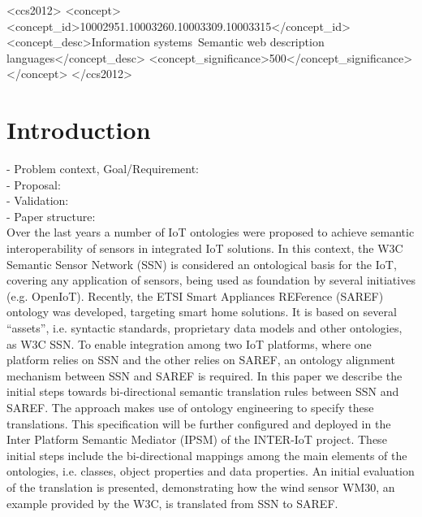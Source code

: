 \documentclass{sig-alternate-05-2015}
\begin{document}
%
%
\begin{CCSXML}
<ccs2012>
<concept>
<concept_id>10002951.10003260.10003309.10003315</concept_id>
<concept_desc>Information systems~Semantic web description languages</concept_desc>
<concept_significance>500</concept_significance>
</concept>
</ccs2012>
\end{CCSXML}



%
%

%
%
\printccsdesc



\section{Introduction}
- Problem context, Goal/Requirement:\\
- Proposal:\\
- Validation:\\ 
- Paper structure:\\ 
Over the last years a number of IoT ontologies were proposed to achieve semantic interoperability of sensors in integrated IoT solutions. In this context, the W3C Semantic Sensor Network (SSN) is considered an ontological basis for the IoT, covering any application of sensors, being used as foundation by several initiatives (e.g. OpenIoT). Recently, the ETSI Smart Appliances REFerence (SAREF) ontology was developed, targeting smart home solutions. It is based on several “assets”, i.e. syntactic standards, proprietary data models and other ontologies, as W3C SSN. To enable integration among two IoT platforms, where one platform relies on SSN and the other relies on SAREF, an ontology alignment mechanism between SSN and SAREF is required. In this paper we describe the initial steps towards bi-directional semantic translation rules between SSN and SAREF. The approach makes use of ontology engineering to specify these translations. This specification will be further configured and deployed in the Inter Platform Semantic Mediator (IPSM) of the INTER-IoT project. These initial steps include the bi-directional mappings among the main elements of the ontologies, i.e. classes, object properties and data properties. An initial evaluation of the translation is presented, demonstrating how the wind sensor WM30, an example provided by the W3C, is translated from SSN to SAREF.
\end{document}
